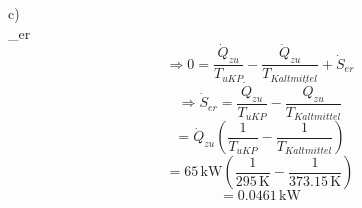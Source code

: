 c) \\
 \quad {}_{er}
\]
\]
\[
\Rightarrow 0 = \frac{\dot{Q}_{zu}}{T_{uKP}} - \frac{\dot{Q}_{zu}}{T_{Kaltmittel}} + \dot{S}_{er}
\]
\[
\Rightarrow \dot{S}_{er} = \frac{\dot{Q}_{zu}}{T_{uKP}} - \frac{\dot{Q}_{zu}}{T_{Kaltmittel}}
\]
\[
= \dot{Q}_{zu} \left( \frac{1}{T_{uKP}} - \frac{1}{T_{Kaltmittel}} \right)
\]
\[
= 65 \, \text{kW} \left( \frac{1}{295 \, \text{K}} - \frac{1}{373.15 \, \text{K}} \right)
\]
\[
= 0.0461 \, \text{kW}
\]